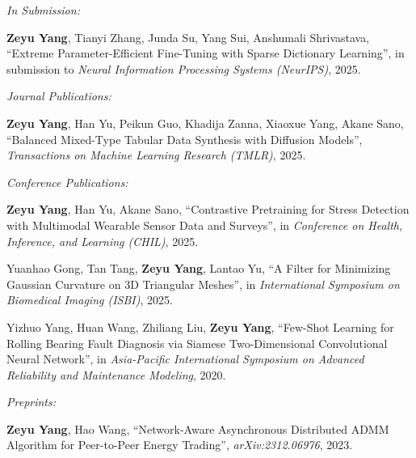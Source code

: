 \documentclass[11pt]{article}
\begin{document}
\textit{In Submission:}

\begin{enumerate}[label={[\arabic*]}]
    \item \label{anshu-lluf} \textbf{Zeyu Yang}, Tianyi Zhang, Junda Su, Yang Sui, Anshumali Shrivastava, ``Extreme Parameter-Efficient Fine-Tuning with Sparse Dictionary Learning'', in submission to \textit{Neural Information Processing Systems (NeurIPS)}, 2025.
\end{enumerate}

\vspace{\lineskip}

\textit{Journal Publications:}

\begin{enumerate}[resume, label={[\arabic*]}]
    \item \label{akane-ddpm} \textbf{Zeyu Yang}, Han Yu, Peikun Guo, Khadija Zanna, Xiaoxue Yang, Akane Sano,
    ``Balanced Mixed-Type Tabular Data Synthesis with Diffusion Models'', \textit{Transactions on Machine Learning Research (TMLR)}, 2025.
\end{enumerate}

\vspace{\lineskip}
    
\textit{Conference Publications:}

\begin{enumerate}[resume, label={[\arabic*]}]
    \item \label{akane-clsp} \textbf{Zeyu Yang}, Han Yu, Akane Sano, ``Contrastive Pretraining for Stress Detection with Multimodal Wearable Sensor Data and Surveys'', in \textit{Conference on Health, Inference, and Learning (CHIL)}, 2025.
    \item Yuanhao Gong, Tan Tang, \textbf{Zeyu Yang}, Lantao Yu, ``A Filter for Minimizing Gaussian Curvature on 3D Triangular Meshes'', in \textit{International Symposium on Biomedical Imaging (ISBI)}, 2025.
    \item Yizhuo Yang, Huan Wang, Zhiliang Liu, \textbf{Zeyu Yang}, 
    ``Few-Shot Learning for Rolling Bearing Fault Diagnosis via Siamese Two-Dimensional Convolutional Neural Network'', 
    in \textit{Asia-Pacific International Symposium on Advanced Reliability and Maintenance Modeling}, 2020.
\end{enumerate}

\textit{Preprints:}

\begin{enumerate}[resume, label={[\arabic*]}]
    \item \label{hao-admm} \textbf{Zeyu Yang}, Hao Wang, 
    ``Network-Aware Asynchronous Distributed ADMM Algorithm for Peer-to-Peer Energy Trading'', \textit{arXiv:2312.06976}, 2023.
\end{enumerate}
\end{document}
